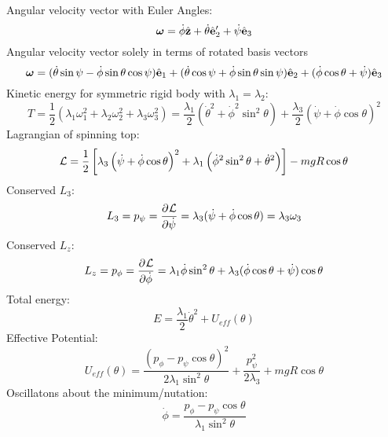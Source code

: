 \documentclass[../PHYS306Notes.tex]{subfiles}
\begin{document}
Angular velocity vector with Euler Angles:
\begin{equation}
    \bm{\omega} = \dot{\phi}\hat{\mathbf{z}} + \dot{\theta}\hat{\mathbf{e}}_2' + \dot{\psi}\hat{\mathbf{e}}_3
\end{equation}
Angular velocity vector solely in terms of rotated basis vectors
\begin{equation}
    \bm{\omega} = (\dot{\theta}\sin\psi - \dot{\phi}\sin\theta\cos\psi)\hat{\mathbf{e}}_1 + (\dot{\theta}\cos\psi + \dot{\phi}\sin\theta\sin\psi)\hat{\mathbf{e}}_2 + (\dot{\phi}\cos\theta + \dot{\psi})\hat{\mathbf{e}}_3
\end{equation}
Kinetic energy for symmetric rigid body with $\lambda_1 = \lambda_2$:
\begin{equation}
    T = \frac{1}{2}\left(\lambda_1\omega_1^2 + \lambda_2\omega_2^2 + \lambda_3\omega_3^2\right) = \frac{\lambda_1}{2}(\dot{\theta}^2 + \dot{\phi}^2\sin^2\theta) + \frac{\lambda_3}{2}(\dot{\psi} + \dot{\phi}\cos\theta)^2
\end{equation}
Lagrangian of spinning top:
\begin{equation}
    \mathcal{L} = \frac{1}{2}\left[\lambda_3\left(\dot{\psi} + \dot{\phi}\cos\theta\right)^2 + \lambda_1\left(\dot{\phi}^2\sin^2\theta + \dot{\theta}^2\right)\right] - mgR\cos\theta
\end{equation}
Conserved $L_3$:
\begin{equation}
    L_3 = p_\psi = \dpd{\LL}{\dot{\psi}} = \lambda_3(\dot{\psi} + \dot{\phi}\cos\theta) = \lambda_3\omega_3
\end{equation}
Conserved $L_z$:
\begin{equation}
    L_z = p_\phi = \dpd{\LL}{\dot{\phi}} = \lambda_1\dot{\phi}\sin^2\theta + \lambda_3(\dot{\phi}\cos\theta + \dot{\psi})\cos\theta
\end{equation}
Total energy:
\begin{equation}
    E = \frac{\lambda_1}{2}\dot{\theta}^2 + U_{eff}(\theta)
\end{equation}
Effective Potential:
\begin{equation}
    U_{eff}(\theta) = \frac{(p_\phi - p_\psi\cos\theta)^2}{2\lambda_1\sin^2\theta} + \frac{p_\psi^2}{2\lambda_3} + mgR\cos\theta
\end{equation}
Oscillatons about the minimum/nutation:
\begin{equation}
    \dot{\phi} = \frac{p_\phi - p_\psi\cos\theta}{\lambda_1\sin^2\theta}
\end{equation}
\end{document}
